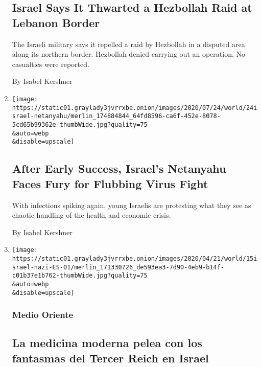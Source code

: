 \begin{enumerate}
{  \subsection{Israel Says It Thwarted a Hezbollah Raid at Lebanon
  Border}\label{israel-says-it-thwarted-a-hezbollah-raid-at-lebanon-border}}

  The Israeli military says it repelled a raid by Hezbollah in a
  disputed area along its northern border. Hezbollah denied carrying out
  an operation. No casualties were reported.

  By Isabel Kershner
\item
  \href{/2020/07/24/world/middleeast/israel-virus-protests-netanyahu.html}{}

  \texttt{[image: https://static01.graylady3jvrrxbe.onion/images/2020/07/24/world/24israel-netanyahu/merlin\_174884844\_64fd8596-ca6f-452e-8078-5cd65b99362e-thumbWide.jpg?quality=75\\\&auto=webp\\\&disable=upscale]}

  \hypertarget{after-early-success-israels-netanyahu-faces-fury-for-flubbing-virus-fight}{%
  \subsection{After Early Success, Israel's Netanyahu Faces Fury for
  Flubbing Virus
  Fight}\label{after-early-success-israels-netanyahu-faces-fury-for-flubbing-virus-fight}}

  With infections spiking again, young Israelis are protesting what they
  see as chaotic handling of the health and economic crisis.

  By Isabel Kershner
\item
  \href{/es/2020/05/15/espanol/mundo/libro-nazi-israel-medicina.html}{}

  \texttt{[image: https://static01.graylady3jvrrxbe.onion/images/2020/04/21/world/15israel-nazi-ES-01/merlin\_171330726\_de593ea3-7d90-4eb9-b14f-c01b37e1b762-thumbWide.jpg?quality=75\\\&auto=webp\\\&disable=upscale]}

  \hypertarget{medio-oriente}{%
  \subsubsection{Medio Oriente}\label{medio-oriente}}

  \hypertarget{la-medicina-moderna-pelea-con-los-fantasmas-del-tercer-reich-en-israel}{%
  \subsection{La medicina moderna pelea con los fantasmas del Tercer
  Reich en
  Israel}\label{la-medicina-moderna-pelea-con-los-fantasmas-del-tercer-reich-en-israel}}


\end{enumerate}
